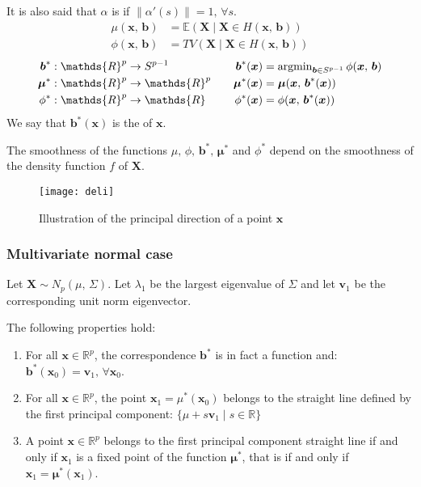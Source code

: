 It is also said that $\alpha$ is  if $\lVert \alpha'(s) \rVert = 1,\,\forall s$.
\begin{align*}
	\mu(\boldsymbol x,\, \boldsymbol b)  & = \mathds{E}(\boldsymbol X \mid \boldsymbol X \in H(\boldsymbol x,\, \boldsymbol b)) \\
	\phi(\boldsymbol x,\, \boldsymbol b) & = TV(\boldsymbol X \mid \boldsymbol X \in H(\boldsymbol x,\, \boldsymbol b))
\end{align*}
\begin{alignat*}{2}
	\boldsymbol b^*   & : \mathds{R}^p \to S^{p-1}      & \quad \boldsymbol b^*(\boldsymbol x)   & = \argmin_{\boldsymbol b \in S^{p-1}} \phi(\boldsymbol x,\, \boldsymbol b) \\
	\boldsymbol \mu^* & : \mathds{R}^p \to \mathds{R}^p & \quad \boldsymbol \mu^*(\boldsymbol x) & = \boldsymbol \mu(\boldsymbol x,\, \boldsymbol b^*(\boldsymbol x))         \\
	\phi^*            & : \mathds{R}^p \to \mathds{R}   & \quad \phi^*(\boldsymbol x)            & = \phi(\boldsymbol x,\, \boldsymbol b^*(\boldsymbol x))
\end{alignat*}
We say that $\boldsymbol b^*(\boldsymbol x)$ is the  of $\boldsymbol x$.

The smoothness of the functions $\mu,\, \phi,\, \boldsymbol b^*,\, \boldsymbol \mu^*$ and $\phi^*$ depend
on the smoothness of the density function $f$ of $\boldsymbol X$.

\begin{figure}[H]
	\texttt{[image: deli]}
	\caption{Illustration of the principal direction of a point $\boldsymbol x$}
\end{figure}

\subsubsection{Multivariate normal case}
\begin{prop}{}{}
	Let $\boldsymbol X \sim N_p(\mu,\, \Sigma)$. Let $\lambda_1$ be the largest eigenvalue of $\Sigma$
	and let $\boldsymbol v_1$ be the corresponding unit norm eigenvector.

	The following properties hold:
	\begin{enumerate}
		\item For all $\boldsymbol x \in \mathds{R}^p$, the correspondence $\boldsymbol b^*$ is in
		      fact a function and: $\boldsymbol b^*(\boldsymbol x_0) = \boldsymbol v_1,\,\forall\boldsymbol x_0$.
		\item For all $\boldsymbol x \in \mathds{R}^p$, the point $\boldsymbol x_1 = \mu^*(\boldsymbol x_0)$
		      belongs to the straight line defined by the first principal component:
		      $\{\mu + s\boldsymbol v_1 \mid s \in \mathds R\}$
		\item A point $\boldsymbol x \in \mathds{R}^p$ belongs to the first principal component
		      straight line if and only if $\boldsymbol x_1$ is a fixed point of the function
		      $\boldsymbol \mu^*$, that is if and only if $\boldsymbol x_1 = \boldsymbol \mu^*(\boldsymbol x_1)$.
	\end{enumerate}
\end{prop}

